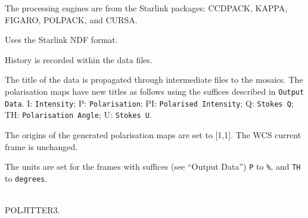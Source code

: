 \documentclass[twoside,11pt]{article}
\newcommand{\htmlref}[2]{#1}
\newcommand{\xref}[3]{#1}
\renewcommand{\_}{\texttt{\symbol{95}}}
\newcommand{\CCDPACK}{{\footnotesize CCDPACK}}
\newcommand{\CURSA}{{\footnotesize CURSA}}
\newcommand{\FIGARO}{\mbox{\footnotesize FIGARO}}
\newcommand{\KAPPA}{{\footnotesize KAPPA}}
\newcommand{\POLPACK}{{\footnotesize POLPACK}}
\newcommand{\sstdiytopic}[2]{\goodbreak \item[{\hspace{-0.35em}#1\hspace{-0.35em}:}] \mbox{} \\[1.3ex] #2}
\newcommand{\sstitem}{\item}
\newcommand{\sstdiytopic}[2]{\item[{#1}:]
      \begin{description}
         #2
      \end{description}
      \\
   }
\begin{document}
{{{         \sstitem
         The processing engines are from the Starlink packages: \xref{\CCDPACK}{sun139}{},
         \xref{\KAPPA}{sun95}{}, \xref{\FIGARO}{sun86}{}, \xref{\POLPACK}{sun223}{},
         and \xref{\CURSA}{sun190}{}.

         \sstitem
         Uses the Starlink NDF format.

         \sstitem
         History is recorded within the data files.

         \sstitem
         The title of the data is propagated through intermediate files
         to the mosaics.  The polarisation maps have new titles as follows
         using the suffices described in {\tt{Output Data}}.  I: {\tt{Intensity}};
         P: {\tt{Polarisation}}; PI: {\tt{Polarised Intensity}}; Q: {\tt{Stokes Q}};
         TH: {\tt{Polarisation Angle}}; U: {\tt{Stokes U}}.

         \sstitem
         The origins of the generated polarisation maps are set to [1,1].
         The WCS current frame is unchanged.

         \sstitem
         The units are set for the frames with suffices (see \htmlref{``Output Data''}{pj_data})
         {\tt{P}} to {\tt{\%}}, and {\tt{TH}} to {\tt{degrees}}.
      }
   }
   \sstdiytopic{
      Deprecated Variants
   }{
      POL\_JITTER3.
   }
}
\end{document}
